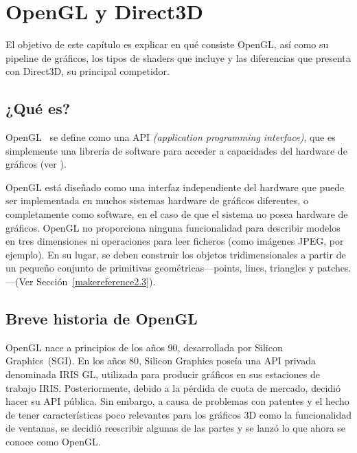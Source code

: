 
\cleardoublepage


\chapter{OpenGL y Direct3D}
\label{makereference2}

El objetivo de este capítulo es explicar en qué consiste OpenGL, así como su
pipeline de gráficos, los tipos de shaders que incluye y las diferencias que
presenta con Direct3D, su principal competidor.

\section{¿Qué es?}
\label{makereference2.1}

OpenGL~\cite{OpenGL} se define como una API \textit{(application programming interface)}, que
es simplemente una librería de software para acceder a capacidades del hardware
de gráficos (ver \citet{Shreiner:2009:OPG:1696492}).

OpenGL está diseñado como una interfaz independiente del hardware que puede ser
implementada en muchos sistemas hardware de gráficos diferentes, o completamente
como software, en el caso de que el sistema no posea hardware de gráficos.
OpenGL no proporciona ninguna funcionalidad para describir modelos en tres
dimensiones ni operaciones para leer ficheros (como imágenes JPEG, por ejemplo).
En su lugar, se deben construir los objetos tridimensionales a partir de un
pequeño conjunto de primitivas geométricas---points, lines, triangles y
patches.---(Ver Sección~\ref{makereference2.3}).

\section{Breve historia de OpenGL}
\label{makereference2.2}

OpenGL nace a principios de los años 90, desarrollada por Silicon Graphics~(SGI).  En
los años 80, Silicon Graphics poseía una API privada denominada IRIS GL,
utilizada para producir gráficos en sus estaciones de trabajo IRIS.
Posteriormente, debido a la pérdida de cuota de mercado, decidió hacer su API
pública. Sin embargo, a causa de problemas con patentes y el hecho de tener
características poco relevantes para los gráficos 3D como la funcionalidad de
ventanas, se decidió reescribir algunas de las partes y se lanzó lo que ahora se
conoce como OpenGL.

